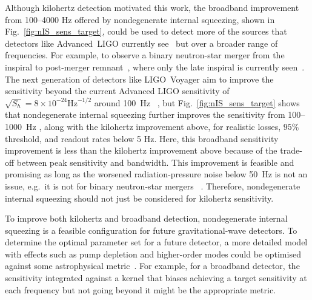 Although kilohertz detection motivated this work, the broadband improvement from 100--4000 Hz offered by nondegenerate internal squeezing, shown in Fig.~\ref{fig:nIS_sens_target}, could be used to detect more of the sources that detectors like Advanced~LIGO currently see~\cite{} but over a broader range of frequencies. For example, to observe a binary neutron-star merger from the inspiral to post-merger remnant~\cite{}, where only the late inspiral is currently seen~\cite{}.  The next generation of detectors like LIGO~Voyager aim to improve the sensitivity beyond the current Advanced LIGO sensitivity of $\sqrt{S_h}=8\times10^{-24}\text{Hz}^{-1/2}$ around 100~Hz~\cite{PhysRevD.93.112004} , but Fig.~\ref{fig:nIS_sens_target} shows that nondegenerate internal squeezing further improves the sensitivity from 100--1000~Hz , along with the kilohertz improvement above, for realistic losses, $95\%$ threshold, and readout rates below 5 Hz. Here, this broadband sensitivity improvement is less than the kilohertz improvement above  because of the trade-off between peak sensitivity and bandwidth. This improvement is feasible and promising as long as the worsened radiation-pressure noise below 50~Hz is not an issue, e.g.\ it is not for binary neutron-star mergers~\cite{} . Therefore, nondegenerate internal squeezing should not just be considered for kilohertz sensitivity.


To improve both kilohertz and broadband detection, nondegenerate internal squeezing is a feasible configuration for future gravitational-wave detectors. To determine the optimal parameter set for a future detector, a more detailed model with effects such as pump depletion and higher-order modes  could be optimised against some astrophysical metric~\cite{}. For example, for a broadband detector, the sensitivity integrated against a kernel that biases achieving a target sensitivity at each frequency but not going beyond it might be the appropriate metric. 


